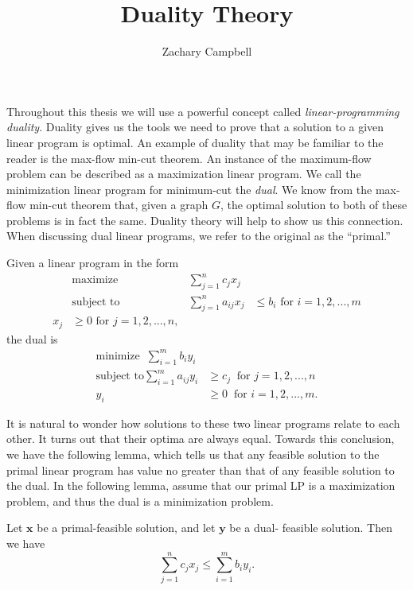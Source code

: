 \documentclass[11pt]{article}
\newenvironment{lemma}[2][Lemma]{\begin{trivlist}
\item[\hskip \labelsep {\bfseries #1}\hskip \labelsep {\bfseries #2.}]}{\end{trivlist}}
\newenvironment{definition}[2][Definition]{\begin{trivlist}
\item[\hskip \labelsep {\bfseries #1}\hskip \labelsep {\bfseries #2.}]}{\end{trivlist}}
\begin{document}
\title{Duality Theory}
\author{Zachary Campbell}

\maketitle

Throughout this thesis we will use a powerful concept called 
\emph{linear-programming duality}. Duality gives us the tools we need to prove that a 
solution to a given linear program is optimal. An example of duality that may be familiar 
to the reader is the max-flow min-cut theorem. An instance of the maximum-flow problem can 
be described as a maximization linear program. We call the minimization linear program for 
minimum-cut the \emph{dual}. We know from the max-flow min-cut theorem that, given a graph 
$G$, the optimal solution to both of these problems is in fact the same. Duality theory will 
help to show us this connection. When discussing dual linear programs, we refer to the 
original as the ``primal.''

\begin{definition}{}
	Given a linear program in the form
	\begin{align}
		&\text{maximize} &\sum_{j=1}^{n} c_j x_j \\
		&\text{subject to}
		&\sum_{j=1}^{n} a_{ij} x_j &\leq b_i \text{ for } i = 1,2,...,m \\
		x_j &\geq 0 \text{ for } j = 1,2,...,n,
	\end{align}
	the dual is 
	\begin{align}
		\text{minimize}\; \; \sum_{i=1}^{m} b_i y_i \\
		\text{subject to}
		\sum_{i=1}^{m} a_{ij} y_i &\geq c_j \; \; \text{for } j = 1,2,...,n \\
		y_i &\geq 0 \; \; \text{for } i = 1,2,...,m.
	\end{align}
\end{definition}

It is natural to wonder how solutions to these two linear programs relate to each other. 
It turns out that their optima are always equal. Towards this conclusion, we have the 
following lemma, which tells us that any feasible solution to the primal linear program 
has value no greater than that of any feasible solution to the dual. In the following lemma,
assume that our primal LP is a maximization problem, and thus the dual is a minimization 
problem.

\begin{lemma}{(Weak-duality)}
	Let $\mathbf{x}$ be a primal-feasible solution, and let $\mathbf{y}$ be a dual-
	feasible solution. Then we have
	\[
		\sum_{j=1}^{n} c_j x_j \leq \sum_{i=1}^{m} b_i y_i.
	\]
\end{lemma}
\end{document}
